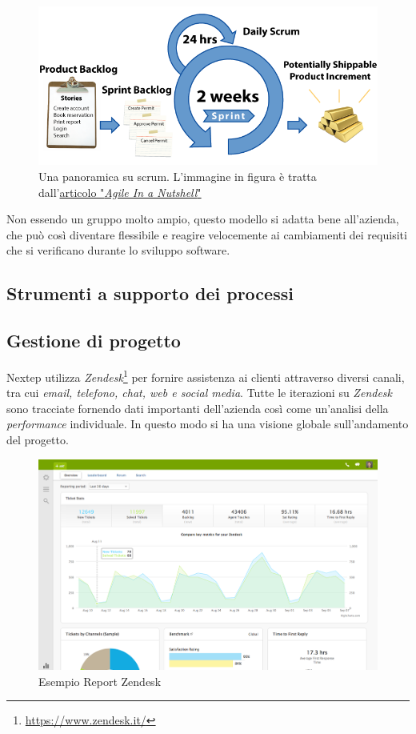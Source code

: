 \begin{figure}[h]
\centering
\includegraphics[width=0.7\linewidth]{immagini/scrum}
\caption[Una panoramica su scrum]{Una panoramica su scrum. L'immagine in figura è tratta dall'\href{http://www.agilenutshell.com/scrum}{articolo "\textit{Agile In a Nutshell}"}}
\label{fig:scrum}
\end{figure}
\newpage
Non essendo un gruppo molto ampio, questo modello si adatta bene all'azienda, che può così diventare flessibile e reagire velocemente ai cambiamenti dei requisiti che si verificano durante lo sviluppo software.

\subsection{Strumenti a supporto dei processi}
\subsection*{Gestione di progetto}
Nextep utilizza \textit{Zendesk}\footnote{\url{https://www.zendesk.it/}} per fornire assistenza ai clienti attraverso diversi canali, tra cui \textit{email, telefono, chat, web e social media}. Tutte le iterazioni su \textit{Zendesk} sono tracciate fornendo dati importanti dell'azienda così come un'analisi della \textit{performance} individuale. In questo modo si ha una visione globale sull'andamento del progetto.
\begin{figure}[h]
\centering
\includegraphics[width=1\linewidth]{immagini/reporting}
\caption[Esempio Report Zendesk]{Esempio Report Zendesk}
\label{fig:reporting}
\end{figure}

